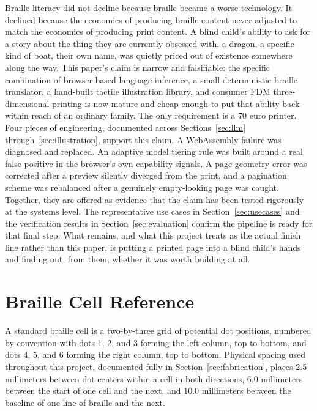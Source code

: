 \documentclass[conference]{IEEEtran}
\begin{document}
Braille literacy did not decline because braille became a worse technology. It declined because the economics of producing braille content never adjusted to match the economics of producing print content. A blind child's ability to ask for a story about the thing they are currently obsessed with, a dragon, a specific kind of boat, their own name, was quietly priced out of existence somewhere along the way. This paper's claim is narrow and falsifiable: the specific combination of browser-based language inference, a small deterministic braille translator, a hand-built tactile illustration library, and consumer FDM three-dimensional printing is now mature and cheap enough to put that ability back within reach of an ordinary family. The only requirement is a 70 euro printer. Four pieces of engineering, documented across Sections~\ref{sec:llm} through~\ref{sec:illustration}, support this claim. A WebAssembly failure was diagnosed and replaced. An adaptive model tiering rule was built around a real false positive in the browser's own capability signals. A page geometry error was corrected after a preview silently diverged from the print, and a pagination scheme was rebalanced after a genuinely empty-looking page was caught. Together, they are offered as evidence that the claim has been tested rigorously at the systems level. The representative use cases in Section~\ref{sec:usecases} and the verification results in Section~\ref{sec:evaluation} confirm the pipeline is ready for that final step. What remains, and what this project treats as the actual finish line rather than this paper, is putting a printed page into a blind child's hands and finding out, from them, whether it was worth building at all.

\appendix

\section{Braille Cell Reference}

A standard braille cell is a two-by-three grid of potential dot positions, numbered by convention with dots 1, 2, and 3 forming the left column, top to bottom, and dots 4, 5, and 6 forming the right column, top to bottom. Physical spacing used throughout this project, documented fully in Section~\ref{sec:fabrication}, places 2.5 millimeters between dot centers within a cell in both directions, 6.0 millimeters between the start of one cell and the next, and 10.0 millimeters between the baseline of one line of braille and the next.
\end{document}
